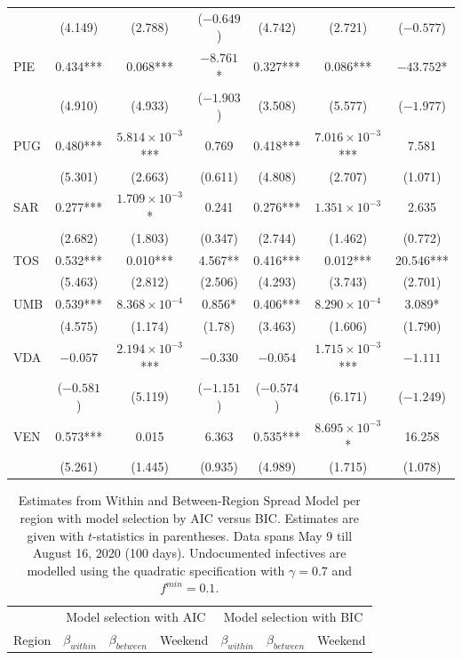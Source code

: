 \documentclass[12pt]{article}
\begin{document}
\begin{appendices}
\begin{longtable}{@{}lcccccc@{}}
             & (4.149) & (2.788) & ($-0.649$) & (4.742) & (2.721) & ($-0.577$) \\ 
            PIE & 0.434*** & 0.068*** & $-8.761$* & 0.327*** & 0.086*** & $-43.752$* \\ 
             & (4.910) & (4.933) & ($-1.903$) & (3.508) & (5.577) & ($-1.977$) \\ 
            PUG & 0.480*** & $5.814 \times 10^{-3}$*** & 0.769 & 0.418*** & $7.016 \times 10^{-3}$*** & 7.581 \\ 
             & (5.301) & (2.663) & (0.611) & (4.808) & (2.707) & (1.071) \\ 
            SAR & 0.277*** & $1.709 \times 10^{-3}$* & 0.241 & 0.276*** & $1.351 \times 10^{-3}$ & 2.635 \\ 
             & (2.682) & (1.803) & (0.347) & (2.744) & (1.462) & (0.772) \\ 
            TOS & 0.532*** & 0.010*** & 4.567** & 0.416*** & 0.012*** & 20.546*** \\ 
             & (5.463) & (2.812) & (2.506) & (4.293) & (3.743) & (2.701) \\ 
            UMB & 0.539*** & $8.368 \times 10^{-4}$ & 0.856* & 0.406*** & $8.290 \times 10^{-4}$ & 3.089* \\ 
             & (4.575) & (1.174) & (1.78) & (3.463) & (1.606) & (1.790) \\ 
            VDA & $-0.057$ & $2.194 \times 10^{-3}$*** & $-0.330$ & $-0.054$ & $1.715 \times 10^{-3}$*** & $-1.111$ \\ 
             & ($-0.581$) & (5.119) & ($-1.151$) & ($-0.574$) & (6.171) & ($-1.249$) \\ 
            VEN & 0.573*** & 0.015 & 6.363 & 0.535*** & $8.695 \times 10^{-3}$* & 16.258 \\ 
             & (5.261) & (1.445) & (0.935) & (4.989) & (1.715) & (1.078) \\* \bottomrule
    	\end{longtable}
		
		\begin{longtable}{@{}lcccccc@{}}
    		\caption{Estimates from Within and Between-Region Spread Model per region with model selection by AIC versus BIC. Estimates are given with $t$-statistics in parentheses. Data spans May 9 till August 16, 2020 (100 days). Undocumented infectives are modelled using the quadratic specification with $\gamma = 0.7$ and $f^{min}=0.1$.}
    		\label{tab:results_within_between_aic_vs_bic}\\
    		\toprule
    		                & \multicolumn{3}{c}{Model selection with AIC} & \multicolumn{3}{c}{Model selection with BIC} \\
    		                \cmidrule(lr){2-4}
                            \cmidrule(lr){5-7}
    		Region          & $\beta_{within}$ & $\beta_{between}$ & Weekend & $\beta_{within}$ & $\beta_{between}$ & Weekend \\* \midrule
    		\endfirsthead
    		

\end{longtable}
\end{appendices}
\end{document}
